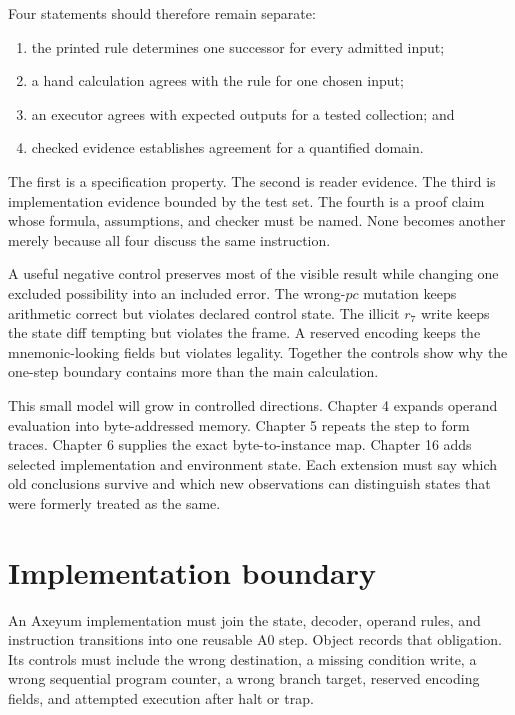 Four statements should therefore remain separate:

\begin{enumerate}
\item the printed rule determines one successor for every admitted input;
\item a hand calculation agrees with the rule for one chosen input;
\item an executor agrees with expected outputs for a tested collection; and
\item checked evidence establishes agreement for a quantified domain.
\end{enumerate}

The first is a specification property. The second is reader evidence. The
third is implementation evidence bounded by the test set. The fourth is a
proof claim whose formula, assumptions, and checker must be named. None
becomes another merely because all four discuss the same instruction.

A useful negative control preserves most of the visible result while changing
one excluded possibility into an included error. The wrong-\(pc\) mutation
keeps arithmetic correct but violates declared control state. The illicit
\(r_7\) write keeps the state diff tempting but violates the frame. A reserved
encoding keeps the mnemonic-looking fields but violates legality. Together
the controls show why the one-step boundary contains more than the main
calculation.

This small model will grow in controlled directions. Chapter 4 expands
operand evaluation into byte-addressed memory. Chapter 5 repeats the step to
form traces. Chapter 6 supplies the exact byte-to-instance map. Chapter 16
adds selected implementation and environment state. Each extension must say
which old conclusions survive and which new observations can distinguish
states that were formerly treated as the same.

\section{Implementation boundary}

An Axeyum implementation must join the state, decoder, operand rules, and
instruction transitions into one reusable A0 step. Object
 records that obligation. Its controls must include the wrong
destination, a missing condition write, a wrong sequential program counter, a
wrong branch target, reserved encoding fields, and attempted execution after
halt or trap.

